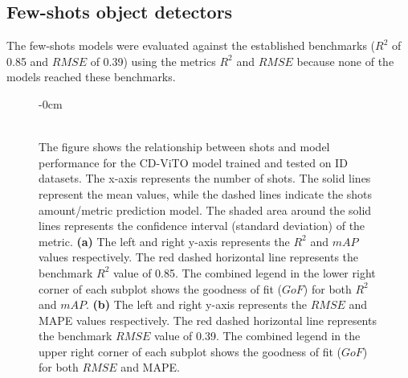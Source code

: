 \documentclass[12pt,a4paper,oneside]{report}
\newlength{\extralength}
\begin{document}
\subsection{Few-shots object detectors}

The few-shots models were evaluated against the established benchmarks ($R^2$ of 0.85 and $RMSE$ of 0.39) 
using the metrics $R^2$ and $RMSE$ because none of the models reached these benchmarks.

\begin{figure}[H]
  \centering
  \begin{adjustwidth}{-\extralength}{0cm}
  \\
  \\
  \caption{The figure shows the relationship between shots and model performance
  for the CD-ViTO model trained and tested on ID datasets.
  The x-axis represents the number of shots.
  The solid lines represent the mean values, while the dashed lines indicate the shots amount/metric 
  prediction model.
  The shaded area around the solid lines represents the confidence interval (standard deviation) of the metric.
  \textbf{(a)} The left and right y-axis represents the $R^2$ and $mAP$ values respectively.
  The red dashed horizontal line represents the benchmark $R^2$ value of 0.85. The combined
  legend in the lower right corner of each subplot shows the goodness of fit ($GoF$) for both $R^2$
  and $mAP$.
  \textbf{(b)} The left and right y-axis represents the $RMSE$ and MAPE values respectively.
  The red dashed horizontal line represents the benchmark $RMSE$ value of 0.39. The combined
  legend in the upper right corner of each subplot shows the goodness of fit ($GoF$) for both $RMSE$
  and MAPE.
  }
  \label{fig:shots_vs_performance}
\end{adjustwidth}
\end{figure}
\end{document}

